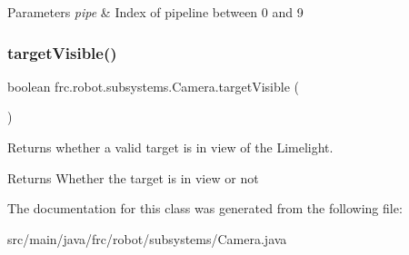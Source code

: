 \begin{DoxyParams}{Parameters}
{\em pipe} & Index of pipeline between 0 and 9 \\
\hline
\end{DoxyParams}
\mbox{\label{classfrc_1_1robot_1_1subsystems_1_1_camera_ad8159ea1c074d6d13845abc44cd6eb02}} 
\subsubsection{\texorpdfstring{targetVisible()}{targetVisible()}}
{\footnotesize\ttfamily boolean frc.\+robot.\+subsystems.\+Camera.\+target\+Visible (\begin{DoxyParamCaption}{ }\end{DoxyParamCaption})\hspace{0.3cm}{\ttfamily [inline]}}



Returns whether a valid target is in view of the Limelight. 

\begin{DoxyReturn}{Returns}
Whether the target is in view or not 
\end{DoxyReturn}


The documentation for this class was generated from the following file\+:\begin{DoxyCompactItemize}
\item 
src/main/java/frc/robot/subsystems/Camera.\+java\end{DoxyCompactItemize}
